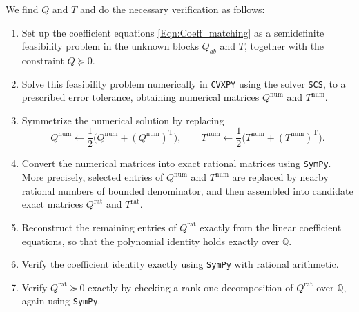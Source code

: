 \documentclass[11pt]{article}
\theoremstyle{plain}
\theoremstyle{definition}
\numberwithin{equation}{section}
\begin{document}
We find $Q$ and $T$ and do the necessary verification as follows:
\begin{enumerate}
    \item Set up the coefficient equations \eqref{Eqn:Coeff_matching} as a semidefinite feasibility 
    problem in the unknown blocks $Q_{ab}$ and $T$, together with the constraint $Q\succeq 0$.
    \item Solve this feasibility problem numerically in \texttt{CVXPY} using the solver \texttt{SCS}, 
    to a prescribed error tolerance, obtaining numerical matrices $Q^{\mathrm{num}}$ and $T^{\mathrm{num}}$.
    \item Symmetrize the numerical solution by replacing
    \[
    Q^{\mathrm{num}}\leftarrow \frac12\bigl(Q^{\mathrm{num}}+(Q^{\mathrm{num}})^{\mathrm{T}}\bigr),
    \qquad
    T^{\mathrm{num}}\leftarrow \frac12\bigl(T^{\mathrm{num}}+(T^{\mathrm{num}})^{\mathrm{T}}\bigr).
    \]
    \item Convert the numerical matrices into exact rational matrices using \texttt{SymPy}. 
    More precisely, selected entries of $Q^{\mathrm{num}}$ and $T^{\mathrm{num}}$ are replaced by nearby rational numbers of bounded denominator, and then assembled into candidate exact matrices $Q^{\mathrm{rat}}$ and $T^{\mathrm{rat}}$.
    \item Reconstruct the remaining entries of $Q^{\mathrm{rat}}$ exactly from the linear coefficient equations, 
    so that the polynomial identity holds exactly over $\mathbb{Q}$.
    \item Verify the coefficient identity exactly using \texttt{SymPy} with rational arithmetic.
    \item Verify $Q^{\mathrm{rat}}\succeq 0$ exactly by checking a rank one decomposition 
    of $Q^{\mathrm{rat}}$ over $\mathbb{Q}$, again using \texttt{SymPy}.
\end{enumerate}
\end{document}
